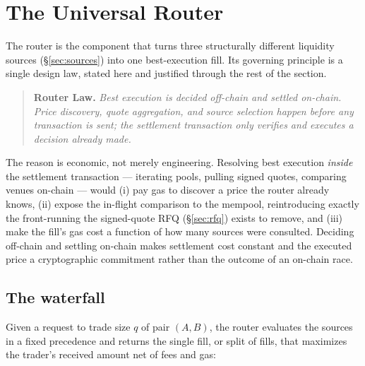 \section{The Universal Router}
\label{sec:router}

The router is the component that turns three structurally different
liquidity sources (\S\ref{sec:sources}) into one best-execution fill. Its
governing principle is a single design law, stated here and justified
through the rest of the section.

\begin{quote}
\textbf{Router Law.} \emph{Best execution is decided off-chain and settled
on-chain. Price discovery, quote aggregation, and source selection happen
before any transaction is sent; the settlement transaction only
\emph{verifies and executes} a decision already made.}
\end{quote}

The reason is economic, not merely engineering. Resolving best execution
\emph{inside} the settlement transaction --- iterating pools, pulling
signed quotes, comparing venues on-chain --- would (i) pay gas to discover
a price the router already knows, (ii) expose the in-flight comparison to
the mempool, reintroducing exactly the front-running the signed-quote RFQ
(\S\ref{sec:rfq}) exists to remove, and (iii) make the fill's gas cost a
function of how many sources were consulted. Deciding off-chain and
settling on-chain makes settlement cost constant and the executed price a
cryptographic commitment rather than the outcome of an on-chain race.

\subsection{The waterfall}
\label{sec:router-waterfall}

Given a request to trade size $q$ of pair $(A,B)$, the router evaluates the
sources in a fixed precedence and returns the single fill, or split of
fills, that maximizes the trader's received amount net of fees and gas:

